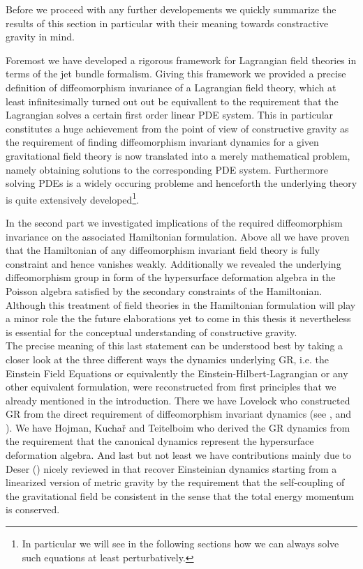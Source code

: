 \documentclass[a4paper,12pt, DIV=14, BCOR=5mm, twoside, headsepline]{scrbook}
\begin{document}
Before we proceed with any further developements we quickly summarize the results of this section in particular with their meaning towards constractive gravity in mind. 

Foremost we have developed a rigorous framework for Lagrangian field theories in terms of the jet bundle formalism.  Giving this framework we provided a precise definition of diffeomorphism invariance of a Lagrangian field theory, which at least infinitesimally turned out out be equivallent to the requirement that the Lagrangian solves a certain first order linear PDE system.  This in particular constitutes a huge achievement from the point of view of constructive gravity as the requirement of finding diffeomorphism invariant dynamics for a given gravitational field theory is now translated into a merely mathematical problem, namely obtaining solutions to the corresponding PDE system. Furthermore solving PDEs is a widely occuring probleme and henceforth the underlying theory is quite extensively developed\footnote{In particular we will see in the following sections how we can always solve such equations at least perturbatively.}.

In the second part we investigated implications of the required diffeomorphism invariance on the associated Hamiltonian formulation. Above all we have proven that the Hamiltonian of any diffeomorphism invariant field theory is fully constraint and hence vanishes weakly. Additionally we revealed the underlying diffeomorphism group in form of the hypersurface deformation algebra in the Poisson algebra satisfied by the secondary constraints of the Hamiltonian. Although this treatment of field theories in the Hamiltonian formulation will play a minor role the the future elaborations yet to come in this thesis it nevertheless is essential for the conceptual understanding of constructive gravity. \\ 

The precise meaning of this last statement can be understood best by taking a closer look at the three different ways the dynamics underlying GR, i.e. the Einstein Field Equations or equivalently the Einstein-Hilbert-Lagrangian or any other equivalent formulation, were reconstructed from first principles that we already mentioned in the introduction. There we have Lovelock who constructed GR from the direct requirement of diffeomorphism invariant dynamics (see \cite{Lovelock1969}, \cite{doi:10.1063/1.1665613} and \cite{doi:10.1063/1.1666069}). 
We have Hojman, Kuchař and Teitelboim who derived the GR dynamics from the requirement that the canonical dynamics represent the hypersurface deformation algebra. And last but not least we have contributions mainly due to Deser (\cite{1970GReGr...1....9D}) nicely reviewed in \cite{2008IJMPD..17..367P} that recover Einsteinian dynamics starting from a linearized version of metric gravity by the requirement that the self-coupling of the gravitational field be consistent in the sense that the total energy momentum is conserved.
\end{document}
